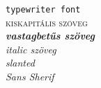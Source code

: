 \documentclass{article}
\begin{document}
\texttt{typewriter font}
\\
\textsc{kiskapitális szöveg}
\\
\emph{\textbf{vastagbetűs szöveg}}
\\
\emph{\textit{italic szöveg}}
\\
\emph{\textsl{slanted}}
\\
\emph{\textsf{Sans Sherif}}
\end{document}
